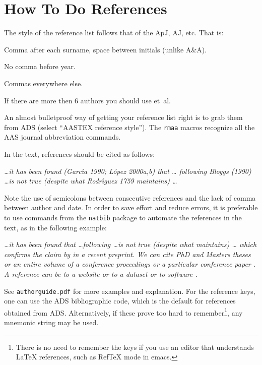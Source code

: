 \documentclass[debug]{rmxaa}
\newenvironment{Example}
{\begin{list}{}{\setlength{\leftmargin}{10pt}\setlength{\rightmargin}{10pt}}%
  \item[]\itshape}
  {\end{list}}
\begin{document}
\section{How To Do References}
\label{sec:refs}

The style of the reference list follows that of the ApJ, AJ, etc. That
is:
\begin{compactitem}
\item Comma after each surname, space between initials (unlike A\&A).
\item No comma before year.
\item Commas everywhere else. 
\item If there are more then 6 authors you should use et~al.
\end{compactitem}
An almost bulletproof way of getting your reference list right is to
grab them from ADS (select ``AASTEX reference style''). The
\texttt{rmaa} macros recognize all the AAS journal abbreviation
commands. 

In the text, references should be cited as follows: 
\begin{Example}
  \dots it has been found (Garc\'\i{}a 1990; L\'opez 2000a,b) that \dots
  following Bloggs (1990) \dots is not true (despite what
  Rodr\'\i{}guez 1759 maintains) \dots
\end{Example}
Note the use of semicolons between consecutive references and the lack
of comma between author and date. In order to save effort and reduce
errors, it is preferable to use commands from the \texttt{natbib}
package to automate the references in the text, as in the following
example:
\begin{Example}
  \dots it has been found \citep{Arthur:2006a, Lazarian:2019a,
    Alarie:2019a} that \dots following \citet{Baldwin:1991a} \dots is
  not true (despite what \citealp{Stromgren:1939a} maintains) \dots
  which confirms the claim by \citeauthor{Chau-Giang:2019a} in a
  recent preprint. We can cite PhD and Masters theses
  \citep{Brookes:2016a, Gutierrez-Soto:2015a} or an entire volume of a
  conference proceedings \citep{2002RMxAC..13.....H} or a particular
  conference paper \citep{Goicoechea:2018a}.  A reference can be to a
  website \citep{Jones:2001a} or to a dataset \citep{Liu:2018c} or to
  software \citep{Zucker:2018a}.
\end{Example}
See \texttt{authorguide.pdf} for more examples and explanation.  For
the reference keys, one can use the ADS bibliographic code, which is
the default for references obtained from ADS. Alternatively, if these
prove too hard to remember\footnote{There is no need to remember the
  keys if you use an editor that understands \LaTeX{} references, such
  as RefTeX mode in emacs.}, any mnemonic string may be used.
\end{document}
